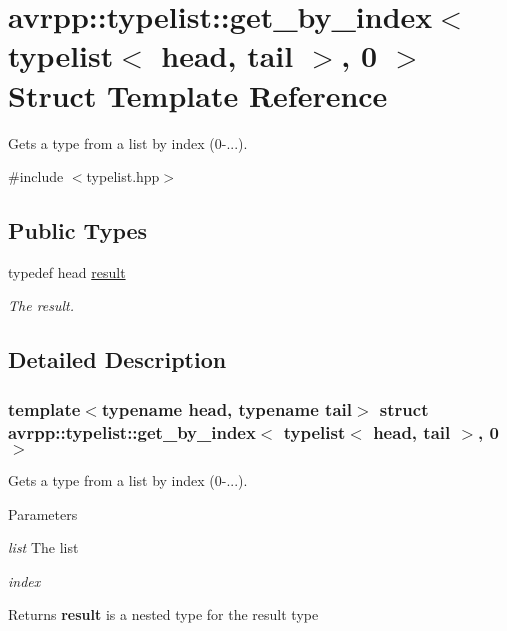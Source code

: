 \hypertarget{structavrpp_1_1typelist_1_1get__by__index_3_01typelist_3_01head_00_01tail_01_4_00_010_01_4}{
\section{avrpp::typelist::get\_\-by\_\-index$<$ typelist$<$ head, tail $>$, 0 $>$ Struct Template Reference}
\label{structavrpp_1_1typelist_1_1get__by__index_3_01typelist_3_01head_00_01tail_01_4_00_010_01_4}
}


Gets a type from a list by index (0-\/...).  




{\ttfamily \#include $<$typelist.hpp$>$}

\subsection*{Public Types}
\begin{DoxyCompactItemize}
\item 
typedef head \hyperlink{structavrpp_1_1typelist_1_1get__by__index_3_01typelist_3_01head_00_01tail_01_4_00_010_01_4_af1f4b9307e52171dec914610ee16c4e0}{result}
\begin{DoxyCompactList}\small\item\em The result. \item\end{DoxyCompactList}\end{DoxyCompactItemize}


\subsection{Detailed Description}
\subsubsection*{template$<$typename head, typename tail$>$ struct avrpp::typelist::get\_\-by\_\-index$<$ typelist$<$ head, tail $>$, 0 $>$}

Gets a type from a list by index (0-\/...). 
\begin{DoxyParams}{Parameters}
\item[{\em list}]The list \item[{\em index}]\end{DoxyParams}
\begin{DoxyReturn}{Returns}
{\bfseries result} is a nested type for the result type 
\end{DoxyReturn}


